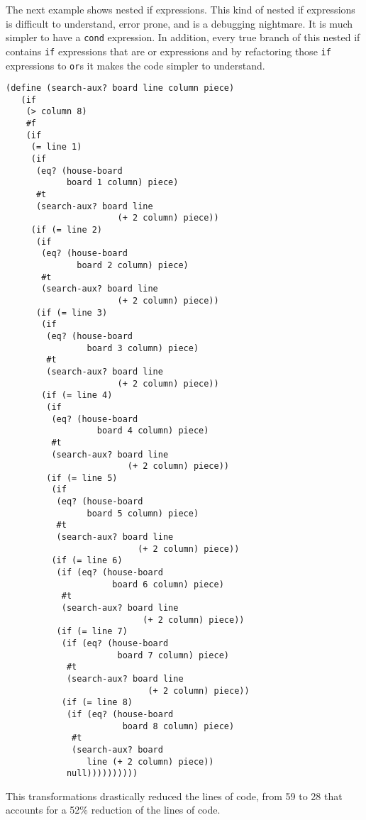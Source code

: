 The next example shows nested if expressions. This kind of nested if expressions
is difficult to understand, error prone, and is a debugging nightmare.
It is much simpler to have a {\tt cond} expression.
In addition, every true branch of this nested if contains {\tt if} expressions that are
or expressions and by refactoring those {\tt if} expressions to {\tt or}s it makes the code
simpler to understand.
\begin{lstlisting}[basicstyle=\ttfamily]
  (define (search-aux? board line column piece)
   (if
    (> column 8)
    #f
    (if
     (= line 1)
     (if
      (eq? (house-board
            board 1 column) piece)
      #t
      (search-aux? board line
                      (+ 2 column) piece))
     (if (= line 2)
      (if
       (eq? (house-board
              board 2 column) piece)
       #t
       (search-aux? board line
                      (+ 2 column) piece))
      (if (= line 3)
       (if
        (eq? (house-board
                board 3 column) piece)
        #t
        (search-aux? board line
                      (+ 2 column) piece))
       (if (= line 4)
        (if
         (eq? (house-board
                  board 4 column) piece)
         #t
         (search-aux? board line
                        (+ 2 column) piece))
        (if (= line 5)
         (if
          (eq? (house-board
                board 5 column) piece)
          #t
          (search-aux? board line
                          (+ 2 column) piece))
         (if (= line 6)
          (if (eq? (house-board
                     board 6 column) piece)
           #t
           (search-aux? board line
                           (+ 2 column) piece))
          (if (= line 7)
           (if (eq? (house-board
                      board 7 column) piece)
            #t
            (search-aux? board line
                            (+ 2 column) piece))
           (if (= line 8)
            (if (eq? (house-board
                       board 8 column) piece)
             #t
             (search-aux? board
                line (+ 2 column) piece))
            null))))))))))
\end{lstlisting}

This transformations drastically reduced the lines of code, from 59 to 28 that accounts
for a 52\% reduction of the lines of code.

